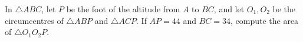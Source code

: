 In $\triangle ABC$, let $P$ be the foot of the altitude from $A$ to $\overline{BC}$, and let $O_1,O_2$ be the circumcentres of $\triangle ABP$ and $\triangle ACP$. If $AP=44$ and $BC=34$, compute the area of $\triangle O_1O_2P$.
